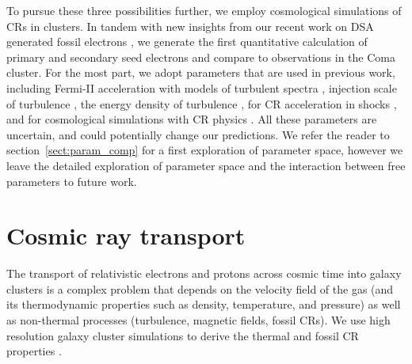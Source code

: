 \documentclass[fleqn,usenatbib,useAMS]{mnras}
\begin{document}
To pursue these three possibilities further, we employ cosmological
simulations of CRs in clusters. In tandem with new insights from our
recent work on DSA generated fossil electrons \citep{pinzke13}, we
generate the first quantitative calculation of primary and secondary
seed electrons and compare to observations in the Coma cluster. For
the most part, we adopt parameters that are used in previous work,
including Fermi-II acceleration with models of turbulent spectra
\citep{brunetti07,brunetti11}, injection scale of turbulence
\citep{2015ApJ...800...60M}, the energy density of turbulence
\citep{2009ApJ...705.1129L,2010ApJ...725.1452S,2011A&A...529A..17V},
for CR acceleration in shocks \citep[][in particular $K_{\rmn{ep}}$
  and the acceleration efficiency]{pinzke13}, and for cosmological
simulations with CR physics \citep[][i.e., shock history,
  temperature profile, density profile, magnetic field
  profile]{pinzke10}. All these parameters are uncertain, and could
potentially change our predictions. We refer the reader to
section~\ref{sect:param_comp} for a first exploration of parameter
space, however we leave the detailed exploration of parameter space and
the interaction between free parameters to future work.


\section{Cosmic ray transport}

The transport of relativistic electrons and protons across cosmic time
into galaxy clusters is a complex problem that depends on the velocity
field of the gas (and its thermodynamic properties such as density,
temperature, and pressure) as well as non-thermal processes
(turbulence, magnetic fields, fossil CRs). We use high resolution
galaxy cluster simulations to derive the thermal and fossil CR
properties \citep[shock accelerated primary CRes and CRps, as well as
  secondary CRes produced in p-p collisions,
  see][]{2007MNRAS.378..385P,pfrommer08,pinzke10,pinzke13}.
\end{document}
